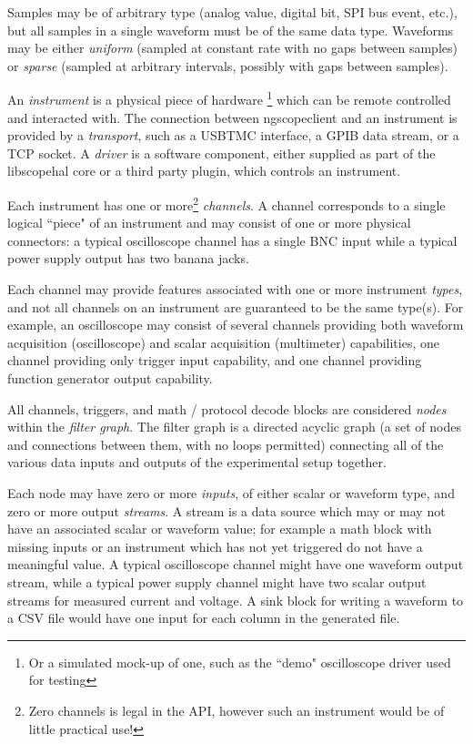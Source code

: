 Samples may be of arbitrary type (analog value, digital bit, SPI bus event, etc.), but all samples in a
single waveform must be of the same data type. Waveforms may be either \emph{uniform} (sampled at constant rate with no
gaps between samples) or \emph{sparse} (sampled at arbitrary intervals, possibly with gaps between samples).

An \emph{instrument} is a physical piece of hardware \footnote{Or a simulated mock-up of one, such as the ``demo"
oscilloscope driver used for testing} which can be remote controlled and interacted with. The connection between
ngscopeclient and an instrument is provided by a \emph{transport}, such as a USBTMC interface, a GPIB data stream, or a
TCP socket. A \emph{driver} is a software component, either supplied as part of the libscopehal core or a third party
plugin, which controls an instrument.

Each instrument has one or more\footnote{Zero channels is legal in the API, however such an instrument would be of
little practical use!} \emph{channels}. A channel corresponds to a single logical ``piece" of an instrument and may
consist of one or more physical connectors: a typical oscilloscope channel has a single BNC input while a typical power
supply output has two banana jacks.

Each channel may provide features associated with one or more instrument \emph{types}, and not all channels on an
instrument are guaranteed to be the same type(s). For example, an oscilloscope may consist of several channels
providing both waveform acquisition (oscilloscope) and scalar acquisition (multimeter) capabilities, one channel
providing only trigger input capability, and one channel providing function generator output capability.

All channels, triggers, and math / protocol decode blocks are considered \emph{nodes} within the \emph{filter graph}.
The filter graph is a directed acyclic graph (a set of nodes and connections between them, with no loops permitted)
connecting all of the various data inputs and outputs of the experimental setup together.

Each node may have zero or more \emph{inputs}, of either scalar or waveform type, and zero or more output
\emph{streams}. A stream is a data source which may or may not have an associated scalar or waveform value; for example
a math block with missing inputs or an instrument which has not yet triggered do not have a meaningful value. A typical
oscilloscope channel might have one waveform output stream, while a typical power supply channel might have two scalar
output streams for measured current and voltage. A sink block for writing a waveform to a CSV file would have one input
for each column in the generated file.

